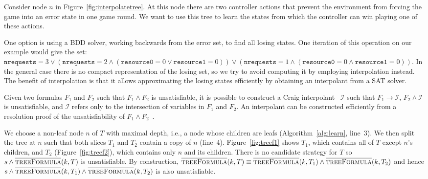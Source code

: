 \begin{exmpInt}

    Consider node $n$ in Figure~\ref{fig:interpolatetree}. At this node there
    are two controller actions that prevent the environment from forcing the
    game into an error state in one game round. We want to use this tree to
    learn the states from which the controller can win playing one of these
    actions.

    One option is using a BDD solver, working backwards from the error set, to
    find all losing states. One iteration of this operation on our example
    would give the set: $\texttt{nrequests} = 3 \lor (\texttt{nrequests} = 2
    \land ( \texttt{resource0} = 0 \lor \texttt{resource1} = 0)) \lor
    (\texttt{nrequests} = 1 \land (\texttt{resource0} = 0 \land
    \texttt{resource1} = 0))$.  In the general case there is no compact
    representation of the losing set, so we try to avoid computing it by
    employing interpolation instead. The benefit of interpolation is
    that it allows approximating the losing states efficiently by obtaining 
    an interpolant from a SAT solver.
\end{exmpInt}


Given two formulas $F_1$ and $F_2$ such that $F_1 \land F_2$ is unsatisfiable,
it is possible to construct a Craig interpolant~\cite{craig1957} $\mathcal{I}$
such that $F_1 \to \mathcal{I}$, $F_2 \land \mathcal{I}$ is unsatisfiable, and
$\mathcal{I}$ refers only to the intersection of variables in $F_1$ and $F_2$.
An interpolant can be constructed efficiently from a resolution proof of the
unsatisfiability of $F_1 \land F_2$~\cite{pudlak1997}.

We choose a non-leaf node $n$ of $T$ with maximal depth, i.e., a node whose
children are leafs (Algorithm~\ref{alg:learn}, line~3). We then split the tree
at $n$ such that both slices $T_1$ and $T_2$ contain a copy of $n$ (line~4).
Figure~\ref{fig:treef1} shows $T_1$, which contains all of $T$ except $n$'s
children, and $T_2$ (Figure~\ref{fig:treef2}), which contains only $n$ and its
children.  There is no candidate strategy for $T$ so $s \land
\textsc{$\overline{\mbox{treeFormula}}$}(k, T)$ is unsatisfiable.  By construction,
$\textsc{$\overline{\mbox{treeFormula}}$}(k, T) \equiv
\textsc{$\overline{\mbox{treeFormula}}$}(k, T_1) \land
\textsc{$\overline{\mbox{treeFormula}}$}(k, T_2)$ and hence $s \land
\textsc{$\overline{\mbox{treeFormula}}$}(k, T_1) \land
\textsc{$\overline{\mbox{treeFormula}}$}(k, T_2)$ is also unsatisfiable.


